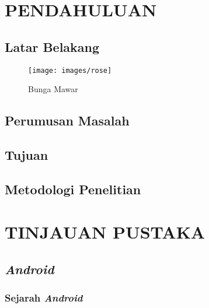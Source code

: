 \documentclass[bahasa, a4paper, 12pt]{report}
\begin{document}
	\renewcommand\thechapter{\Roman{chapter}}
	\renewcommand\thesection{\arabic{chapter}.\arabic{section}}

	\renewcommand{\thefigure}{\arabic{chapter}.\arabic{figure}}
	
	
	\renewcommand{\contentsname}{DAFTAR ISI}
	\tableofcontents
	
	\renewcommand{\listfigurename}{DAFTAR GAMBAR}
	\listoffigures
	
	\renewcommand{\listtablename}{DAFTAR TABEL}
	\listoftables
	

	\chapter{PENDAHULUAN}
		\renewcommand{\thepage}{\Roman{chapter} - \arabic{page}}
	
		\section{Latar Belakang}
			\lipsum[1]
			
			\begin{figure}[tb]
				\centering
				\texttt{[image: images/rose]}
				\caption{Bunga Mawar}
			\end{figure}
		
			\lipsum[1]
			
		\section{Perumusan Masalah}
		
			\lipsum[1]
		\section{Tujuan}
		\section{Metodologi Penelitian}
	\chapter{TINJAUAN PUSTAKA}
		\section{\emph{Android}}
			\subsection{Sejarah \emph{Android}}
\end{document}
